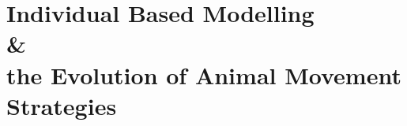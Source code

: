 \documentclass[ twoside,openright,titlepage,numbers=noenddot,%
                headinclude,footinclude,cleardoublepage=empty,abstract=on,
                BCOR=5mm,paper=b5,fontsize=10pt,dvipsnames
                ]{scrreprt}
\begin{document}
% 

\cleardoublepage



\cleardoublepage

% 

\cleardoublepage


\cleardoublepage


\part{Individual Based Modelling\\\&\\the Evolution of Animal Movement Strategies}







% 
% 



\appendix


\end{document}

